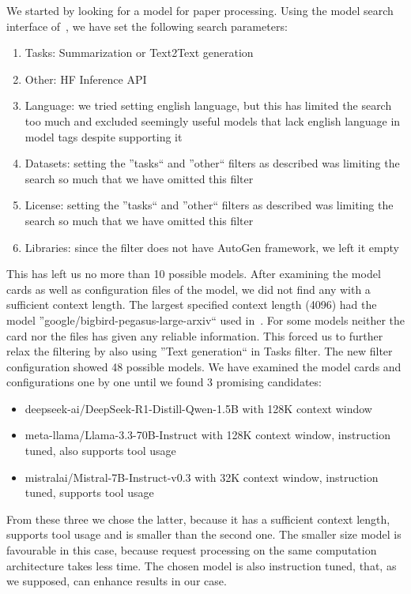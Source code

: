 We started by looking for a model for paper processing. Using the model search interface of~\cite{huggingface}, we have set the following search parameters: 

\begin{enumerate}
	\item Tasks: Summarization or Text2Text generation
	\item Other: HF Inference API
	\item Language: we tried setting english language, but this has limited the search too much and excluded seemingly useful models that lack english language in model tags despite supporting it
	\item Datasets: setting the ''tasks`` and ''other`` filters as described was limiting the search so much that we have omitted this filter
	\item License: setting the ''tasks`` and ''other`` filters as described was limiting the search so much that we have omitted this filter
	\item Libraries: since the filter does not have AutoGen framework, we left it empty
\end{enumerate}

This has left us no more than 10 possible models. After examining the model cards as well as configuration files of the model, we did not find any with a sufficient context length. The largest specified context length (4096) had the model ''google/bigbird-pegasus-large-arxiv`` used in~\cite{zaheer2021big}. For some models neither the card nor the files has given any reliable information. This forced us to further relax the filtering by also using ''Text generation`` in Tasks filter. The new filter configuration showed 48 possible models. We have examined the model cards and configurations one by one until we found 3 promising candidates:

\begin{itemize}
	\item deepseek-ai/DeepSeek-R1-Distill-Qwen-1.5B with 128K context window
	\item meta-llama/Llama-3.3-70B-Instruct with 128K context window, instruction tuned, also supports tool usage
	\item mistralai/Mistral-7B-Instruct-v0.3 with 32K context window, instruction tuned, supports tool usage
\end{itemize}

From these three we chose the latter, because it has a sufficient context length, supports tool usage and is smaller than the second one. The smaller size model is favourable in this case, because request processing on the same computation architecture takes less time. The chosen model is also instruction tuned, that, as we supposed, can enhance results in our case.

